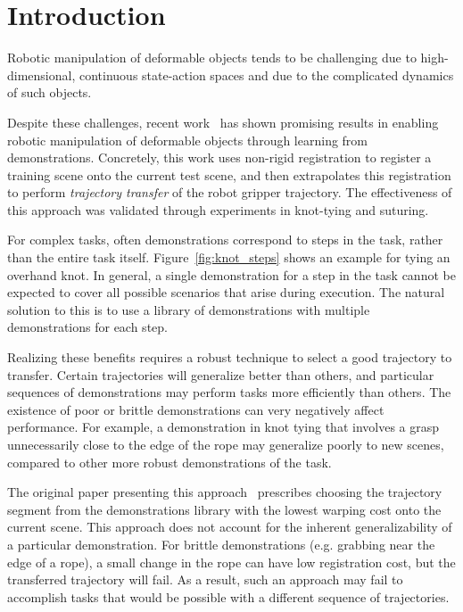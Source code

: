 \section{Introduction}

Robotic manipulation of deformable objects tends to be challenging due to high-dimensional, 
continuous state-action spaces and due to the complicated dynamics of
such objects.

Despite these challenges, recent
work~\cite{Schulmanetal_IROS2013, Schulmanetal_ISRR2013} has shown
promising results in enabling robotic manipulation of deformable
objects through learning from demonstrations.  Concretely, this work
uses non-rigid registration to register a training scene onto the
current test scene, and then extrapolates this registration to perform
\emph{trajectory transfer} of the robot gripper trajectory.  The
effectiveness of this approach was validated through experiments in
knot-tying and suturing.

For complex tasks, often demonstrations correspond to steps in the task, rather
than the entire task itself. Figure~\ref{fig:knot_steps} shows an example
for tying an overhand knot.
In general, a single demonstration for a step in the task cannot be expected
to cover all possible scenarios that arise during execution.
The natural solution to this is to use a library of demonstrations with
multiple demonstrations for each step.

Realizing these benefits requires a robust technique to select a good trajectory to
transfer.  Certain trajectories will generalize better than others, and particular sequences of 
demonstrations may perform tasks more efficiently than others.
The existence of poor or brittle demonstrations can very negatively 
affect performance.
For example, a demonstration in knot tying that involves a grasp
unnecessarily close to the edge of the rope may generalize poorly
to new scenes, compared to other more robust demonstrations of the task.

The original paper presenting this approach~\cite{Schulmanetal_ISRR2013}
prescribes choosing the trajectory segment from the demonstrations
library with the lowest warping cost onto the current scene.
This approach does not account for the inherent generalizability
of a particular demonstration. For brittle demonstrations (e.g. grabbing
near the edge of a rope), a small change in the rope can have low registration
cost, but the transferred trajectory will fail.
As a result, such an approach may fail to accomplish tasks
that would be possible with a different sequence of trajectories.

